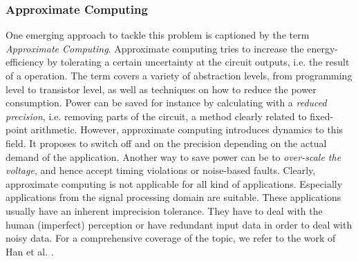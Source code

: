 \documentclass[conference]{IEEEtran}
\begin{document}
\subsubsection*{Approximate Computing}
One emerging approach to tackle this problem is captioned by the term \emph{Approximate Computing}. Approximate computing tries to increase the energy-efficiency by tolerating a certain uncertainty at the circuit outputs, i.e. the result of a operation. The term covers a variety of abstraction levels, from programming level to transistor level, as well as techniques on how to reduce the power consumption. Power can be saved for instance by calculating with a \emph{reduced precision}, i.e. removing parts of the circuit, a method clearly related to fixed-point arithmetic. However, approximate computing introduces dynamics to this field. It proposes to switch off and on the precision depending on the actual demand of the application. Another way to save power can be to \emph{over-scale the voltage}, and hence accept timing violations or noise-based faults. 
Clearly, approximate computing is not applicable for all kind of applications. Especially applications from the signal processing domain are suitable. These applications usually have an inherent imprecision tolerance. They have to deal with the human (imperfect) perception or have redundant input data in order to deal with noisy data. For a comprehensive coverage of the topic, we refer to the work of Han et al. \cite{han_approximate_2013}.
\end{document}

